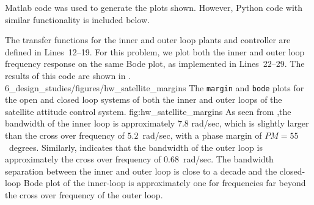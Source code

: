 
Matlab code was used to generate the plots shown. However, Python code with similar functionality is included below.



%
%

The transfer functions for the inner and outer loop plants and controller are defined in Lines~12--19.  For this problem, we plot both the inner and outer loop frequency response on the same Bode plot, as implemented in Lines~22--29. The results of this code are shown in .
	{6_design_studies/figures/hw_satellite_margins}
	{The {\tt margin} and {\tt bode} plots for the open and closed loop systems of both the inner and outer loops of the satellite attitude control system.}
	{fig:hw_satellite_margins} 
As seen from ,the bandwidth of the inner loop is approximately $7.8$ rad/sec, which is slightly larger than the cross over frequency of $5.2$~rad/sec, with a phase margin of $PM=55$~degrees.  
%
Similarly,  indicates that the bandwidth of the outer loop is approximately the cross over frequency of $0.68$~rad/sec.
%
The bandwidth separation between the inner and outer loop is close to a decade and the closed-loop Bode plot of the inner-loop is approximately one for frequencies far beyond the cross over frequency of the outer loop.

